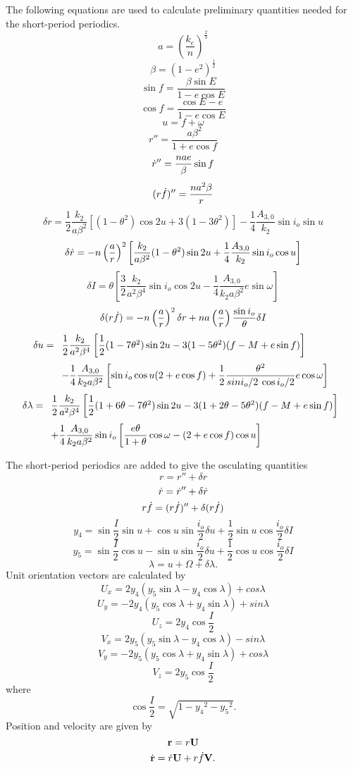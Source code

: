 The following equations are used to calculate preliminary quantities needed for
the short-period periodics.
\[a=\left(\dfrac{k_e}n\right)^{\frac23}\]
\[\beta=(1-e^2)^{\frac12}\]
\[\sin f=\dfrac{\beta\sin E}{1-e\cos E}\]
\[\cos f=\dfrac{\cos E-e}{1-e\cos E}\]
\[u=f+\omega\]
\[r''=\dfrac{a\beta^2}{1+e\cos f}\]
\[\dr''=\dfrac{nae}\beta\sin f\]
\[(r\df)''=\dfrac{na^2\beta}r\]
\[\delta r=\dfrac12\dfrac{k_2}{a\beta^2}[(1-\theta^2)\cos 2u
+3(1-3\theta^2)]-\dfrac14\dfrac{A_{3,0}}{k_2}\sin i_o\sin u\]
\[\delta\dr=-n\left(\dfrac ar\right)^2\left[\dfrac{k_2}{a\beta^2}(1-\theta^2)\sin 2u
+\dfrac14\dfrac{A_{3,0}}{k_2}\sin i_o\cos u\right]\]
\[\delta I=\theta\left[\dfrac32\dfrac{k_2}{a^2\beta^4}\sin i_o\cos 2u
-\dfrac14\dfrac{A_{3,0}}{k_2a\beta^2}e\sin\omega\right]\]
\[\delta(r\df)=-n\left(\dfrac ar\right)^2\delta r+na\left(\dfrac ar\right)\dfrac{\sin i_o}\theta\delta I\]
\[\delta u=\begin{array}[t]{l}
\dfrac12\dfrac{k_2}{a^2\beta^4}\left[\dfrac12(1-7\theta^2)\sin 2u-3(1-5\theta^2)(f-M+e\sin f)\right]\\[12pt]
-\dfrac14\dfrac{A_{3,0}}{k_2a\beta^2}\left[\sin i_o\cos u(2+e\cos f)
+\dfrac12\dfrac{\theta^2}{sin i_o/2\:\cos i_o/2}e\cos\omega\right]
\end{array}\]
\[\delta\lambda=\begin{array}[t]{l}
\dfrac12\dfrac{k_2}{a^2\beta^4}\left[\dfrac12(1+6\theta-7\theta^2)\sin 2u
-3(1+2\theta-5\theta^2)(f-M+e\sin f)\right]\\[12pt]
+\dfrac14\dfrac{A_{3,0}}{k_2a\beta^2}\sin i_o
\left[\dfrac{e\theta}{1+\theta}\cos\omega-(2+e\cos f)\cos u\right]
\end{array}\]

The short-period periodics are added to give the osculating quantities
\[r=r''+\delta r\]
\[\dr=\dr''+\delta\dr\]
\[r\df=(r\df)''+\delta(r\df)\]
\[y_4=\sin \dfrac{I}2\sin u+\cos u\sin \dfrac{i_o}2\delta u+\dfrac12\sin u\cos \dfrac{i_o}2\delta I\]
\[y_5=\sin \dfrac{I}2\cos u-\sin u\sin \dfrac{i_o}2\delta u+\dfrac12\cos u\cos \dfrac{i_o}2\delta I\]
\[\lambda=u+\Omega+\delta\lambda.\]
Unit orientation vectors are calculated by
\[U_x=2y_4(y_5\sin\lambda-y_4\cos\lambda)+cos\lambda\]
\[U_y=-2y_4(y_5\cos\lambda+y_4\sin\lambda)+sin\lambda\]
\[U_z=2y_4\cos \dfrac{I}2\]
\[V_x=2y_5(y_5\sin\lambda-y_4\cos\lambda)-sin\lambda\]
\[V_y=-2y_5(y_5\cos\lambda+y_4\sin\lambda)+cos\lambda\]
\[V_z=2y_5\cos \dfrac{I}2\]
where
\[\cos \dfrac{I}2=\sqrt{1-y_4{}^2-y_5{}^2}.\]
Position and velocity are given by
\[\rvec=r\Uvec\]
\[\drvec=\dr\Uvec+r\df\Vvec.\]

